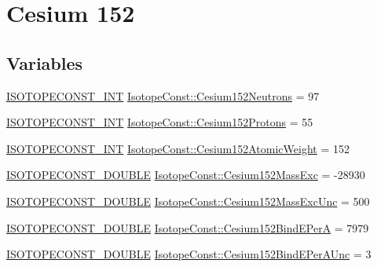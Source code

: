 \hypertarget{group___isotope_const-_cesium-_cs152}{}\section{Cesium 152}
\label{group___isotope_const-_cesium-_cs152}
\subsection*{Variables}
\begin{DoxyCompactItemize}
\item 
\mbox{\hyperlink{group___isotope_const-_macros_ga5f18360b3e99483a35c32d789e62621c}{I\+S\+O\+T\+O\+P\+E\+C\+O\+N\+S\+T\+\_\+\+I\+NT}} \mbox{\hyperlink{group___isotope_const-_cesium-_cs152_gadfbddb2c07f9ad4b83a420b8f0fb32bd}{Isotope\+Const\+::\+Cesium152\+Neutrons}} = 97
\item 
\mbox{\hyperlink{group___isotope_const-_macros_ga5f18360b3e99483a35c32d789e62621c}{I\+S\+O\+T\+O\+P\+E\+C\+O\+N\+S\+T\+\_\+\+I\+NT}} \mbox{\hyperlink{group___isotope_const-_cesium-_cs152_ga398109c0f16ce94f75d7459e6153bafd}{Isotope\+Const\+::\+Cesium152\+Protons}} = 55
\item 
\mbox{\hyperlink{group___isotope_const-_macros_ga5f18360b3e99483a35c32d789e62621c}{I\+S\+O\+T\+O\+P\+E\+C\+O\+N\+S\+T\+\_\+\+I\+NT}} \mbox{\hyperlink{group___isotope_const-_cesium-_cs152_ga02f02883b1bd235858d72af7c1fd4f49}{Isotope\+Const\+::\+Cesium152\+Atomic\+Weight}} = 152
\item 
\mbox{\hyperlink{group___isotope_const-_macros_ga8f45a7272ce02c0b4c65c44636ed719a}{I\+S\+O\+T\+O\+P\+E\+C\+O\+N\+S\+T\+\_\+\+D\+O\+U\+B\+LE}} \mbox{\hyperlink{group___isotope_const-_cesium-_cs152_ga64317f38a389ba6ff06166988f14feae}{Isotope\+Const\+::\+Cesium152\+Mass\+Exc}} = -\/28930
\item 
\mbox{\hyperlink{group___isotope_const-_macros_ga8f45a7272ce02c0b4c65c44636ed719a}{I\+S\+O\+T\+O\+P\+E\+C\+O\+N\+S\+T\+\_\+\+D\+O\+U\+B\+LE}} \mbox{\hyperlink{group___isotope_const-_cesium-_cs152_ga8bf59f6ba3110826f960e243ea07ea03}{Isotope\+Const\+::\+Cesium152\+Mass\+Exc\+Unc}} = 500
\item 
\mbox{\hyperlink{group___isotope_const-_macros_ga8f45a7272ce02c0b4c65c44636ed719a}{I\+S\+O\+T\+O\+P\+E\+C\+O\+N\+S\+T\+\_\+\+D\+O\+U\+B\+LE}} \mbox{\hyperlink{group___isotope_const-_cesium-_cs152_ga6880e3c43e3295260767f80b0023f80a}{Isotope\+Const\+::\+Cesium152\+Bind\+E\+PerA}} = 7979
\item 
\mbox{\hyperlink{group___isotope_const-_macros_ga8f45a7272ce02c0b4c65c44636ed719a}{I\+S\+O\+T\+O\+P\+E\+C\+O\+N\+S\+T\+\_\+\+D\+O\+U\+B\+LE}} \mbox{\hyperlink{group___isotope_const-_cesium-_cs152_ga0ce6722837e9324e7cec3e67023f9f0e}{Isotope\+Const\+::\+Cesium152\+Bind\+E\+Per\+A\+Unc}} = 3

\end{DoxyCompactItemize}
